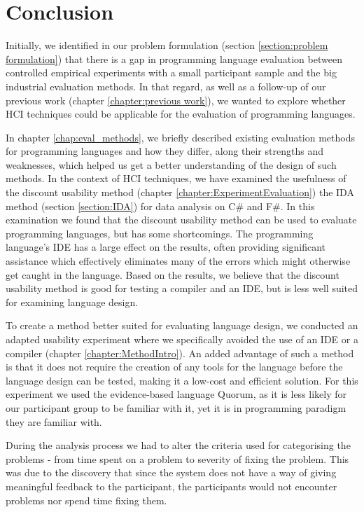 \chapter{Conclusion}
\label{chap:conclusion}

Initially, we identified in our problem formulation (section \ref{section:problem formulation}) that there is a gap in programming language evaluation between controlled empirical experiments with a small participant sample and the big industrial evaluation methods. In that regard, as well as a follow-up of our previous work (chapter \ref{chapter:previous work}), we wanted to explore whether HCI techniques could be applicable for the evaluation of programming languages. 

In chapter \ref{chap:eval_methods}, we briefly described existing evaluation methods for programming languages and how they differ, along their strengths and weaknesses, which helped us get a better understanding of the design of such methods.
In the context of HCI techniques, we have examined the usefulness of the discount usability method (chapter \ref{chapter:ExperimentEvaluation}) the IDA method (section \ref{section:IDA}) for data analysis on C\# and F\#.
In this examination we found that the discount usability method can be used to evaluate programming languages, but has some shortcomings.
The programming language’s IDE has a large effect on the results, often providing significant assistance which effectively eliminates many of the errors which might otherwise get caught in the language.
Based on the results, we believe that the discount usability method is good for testing a compiler and an IDE, but is less well suited for examining language design.

To create a method better suited for evaluating language design, we conducted an adapted usability experiment where we specifically avoided the use of an IDE or a compiler (chapter \ref{chapter:MethodIntro}).
An added advantage of such a method is that it does not require the creation of any tools for the language before the language design can be tested, making it a low-cost and efficient solution. 
For this experiment we used the evidence-based language Quorum, as it is less likely for our participant group to be familiar with it, yet it is in programming paradigm they are familiar with. 

During the analysis process we had to alter the criteria used for categorising the problems - from time spent on a problem to severity of fixing the problem.
This was due to the discovery that since the system does not have a way of giving meaningful feedback to the participant, the participants would not encounter problems nor spend time fixing them.

